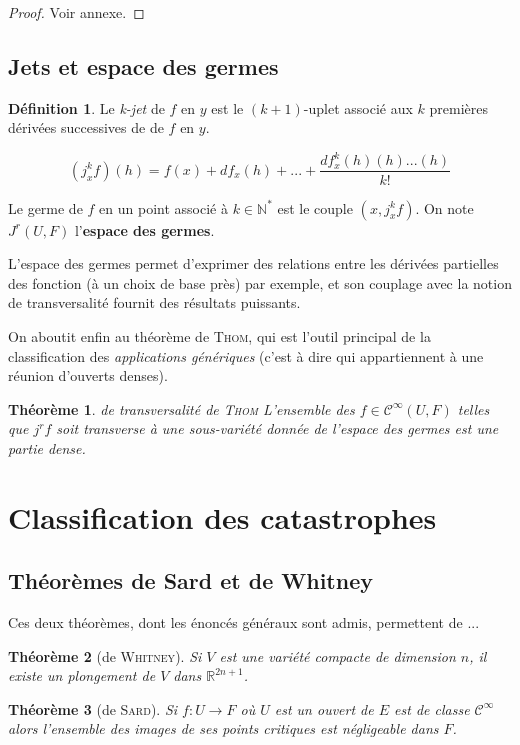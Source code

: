 \documentclass{article}
\newcommand{\cinf}{\mathcal{C}^\infty}
\newcommand{\R}{\mathbb{R}}
\newcommand{\N}{\mathbb{N}}
\newtheorem{thm}{Théorème}
\theoremstyle{definition}
\newtheorem{defn}{Définition}
\begin{document}
\begin{proof} Voir annexe. \end{proof}

\subsection{Jets et espace des germes}

\begin{defn}
	Le \textit{k-jet} de $f$ en $y$ est le $(k+1)$-uplet associé aux $k$ premières dérivées successives de de $f$ en $y$.

	$$(j^k_x f)(h) = f(x) + df_x(h)+...+\frac{df^k_x(h)(h)...(h)}{k!}$$

	Le germe de $f$ en un point associé à $k\in\N^*$ est le couple $(x,j^k_x f)$. On note $J^r(U,F)$ l'\textbf{espace des germes}.
\end{defn}

L'espace des germes permet d'exprimer des relations entre les dérivées partielles des fonction (à un choix de base près) par exemple, et son couplage avec la notion de transversalité fournit des résultats puissants.

On aboutit enfin au théorème de \textsc{Thom}, qui est l'outil principal de la classification des \textit{applications génériques} (c'est à dire qui appartiennent à une réunion d'ouverts denses).

\begin{thm}{de transversalité de \textsc{Thom}}
	L'ensemble des $f\in\cinf(U,F)$ telles que $j^rf$ soit transverse à une sous-variété donnée de l'espace des germes est une partie dense.
\end{thm}

\section{Classification des catastrophes}
\subsection{Théorèmes de Sard et de Whitney}

Ces deux théorèmes, dont les énoncés généraux sont admis, permettent de ...

\begin{thm}[de \textsc{Whitney}]
	Si $V$ est une variété compacte de dimension $n$, il existe un plongement de $V$ dans $\R^{2n+1}$.
\end{thm}

\begin{thm}[de \textsc{Sard}]
	Si $f: U\to F$ où $U$ est un ouvert de $E$ est de classe $\cinf$ alors l'ensemble des images de ses points critiques est négligeable dans $F$.
\end{thm}
\end{document}
